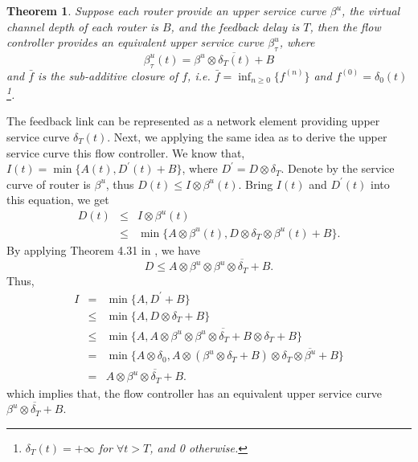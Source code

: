 \documentclass[10pt,journal]{IEEEtran}
\newtheorem{theorem}{Theorem}
\begin{document}
\begin{theorem}\label{credit}
Suppose each router provide an upper service curve $\beta^u$, the virtual channel depth of each router is $B$, and the feedback delay is $T$, then the flow controller provides an equivalent upper service curve $\beta^{u}_\tau$, where $$\beta^{u}_\tau(t)=\overline{\beta^u\otimes\delta_T(t)+B}$$
and $\bar{f}$ is the sub-additive closure of $f$, i.e. $\bar{f}=\inf_{n\geq 0}\{f^{(n)}\}$ and $f^{(0)}=\delta_0(t)$\footnote{$\delta_T(t)=+\infty$ for $\forall t>T$, and 0 otherwise.}.
\end{theorem}
\begin{IEEEproof}
The feedback link can be represented as a network element providing upper service curve $\delta_T(t)$. Next, we applying the same idea as \cite{qian2009analysis} to derive the upper service curve this flow controller. We know that, $I(t)=\min\{A(t),D^\prime(t)+B\}$, where $D^\prime=D\otimes\delta_T$. Denote by the service curve of router is $\beta^u$, thus $D(t)\leq I\otimes \beta^u(t)$. Bring $I(t)$ and $D^\prime(t)$ into this equation, we get
\begin{eqnarray*}
D(t)&\leq& I\otimes \beta^u(t)\\
&\leq& \min\{A\otimes \beta^u(t),D\otimes\delta_T\otimes \beta^u(t)+B\}.
\end{eqnarray*}
By applying Theorem 4.31 in \cite{Boudec2001Network}, we have
$$D\leq A\otimes \beta^u\otimes\overline{\beta^u\otimes\delta_T+B}.$$
Thus,
\begin{eqnarray*}
  I&=& \min\{A,D^\prime+B\}\\
  &\leq& \min\{A,D\otimes\delta_T+B\}\\
  &\leq& \min\{A,A\otimes \beta^u\otimes\overline{\beta^u\otimes\delta_T+B}\otimes\delta_T+B\}\\
  &=& \min\{A\otimes \delta_0,A\otimes (\beta^u\otimes\delta_T+B)\otimes\overline{\delta_T\otimes\beta^u+B}\}\\
  &=& A\otimes\overline{\beta^u\otimes\delta_T+B}.
\end{eqnarray*}
which implies that, the flow controller has an equivalent upper service curve $\overline{\beta^u\otimes\delta_T+B}$.
\end{IEEEproof}
\end{document}
